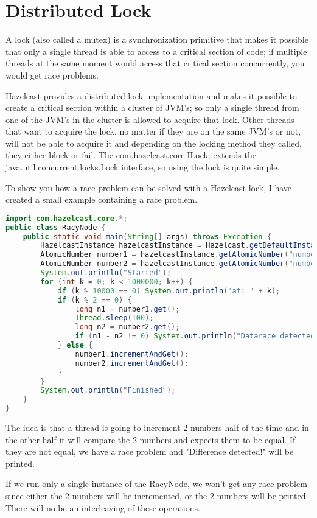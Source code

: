 \section{Distributed Lock}
A lock (also called a mutex) is a synchronization primitive that makes it possible that only a single thread is able to access to a critical section of code; if multiple threads at the same moment would access that critical section concurrently, you would get race problems. 

Hazelcast provides a distributed lock implementation and makes it possible to create a critical section within a cluster of JVM's; so only a single thread from one of the JVM's in the cluster is allowed to acquire that lock. Other threads that want to acquire the lock, no matter if they are on the same JVM's or not, will not be able to acquire it and depending on the locking method they called, they either block or fail. The com.hazelcast.core.ILock; extends the java.util.concurrent.locks.Lock interface, so using the lock is quite simple.

To show you how a race problem can be solved with a Hazelcast lock, I have created a small example containing a race problem.
\begin{lstlisting}[language=java]
import com.hazelcast.core.*;
public class RacyNode {
    public static void main(String[] args) throws Exception {
        HazelcastInstance hazelcastInstance = Hazelcast.getDefaultInstance();
        AtomicNumber number1 = hazelcastInstance.getAtomicNumber("number1");
        AtomicNumber number2 = hazelcastInstance.getAtomicNumber("number2");
        System.out.println("Started");
        for (int k = 0; k < 1000000; k++) {
            if (k % 10000 == 0) System.out.println("at: " + k);
            if (k % 2 == 0) {
                long n1 = number1.get();
                Thread.sleep(100);
                long n2 = number2.get();
                if (n1 - n2 != 0) System.out.println("Datarace detected!");
            } else {
                number1.incrementAndGet();
                number2.incrementAndGet();
            }
        }
        System.out.println("Finished");
    }
}
\end{lstlisting}
The idea is that a thread is going to increment 2 numbers half of the time and in the other half it will compare the 2 numbers and expects them to be equal. If they are not equal, we have a race problem and "Difference detected!" will be printed.

If we run only a single instance of the RacyNode, we won't get any race problem since either the 2 numbers will be incremented, or the 2 numbers will be printed. There will no be an interleaving of these operations.

